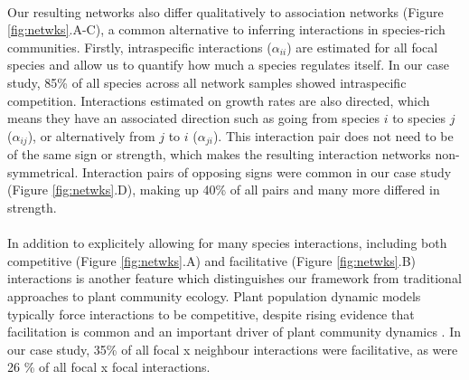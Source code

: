 \documentclass[a4,12pt]{article}
\begin{document}
        \paragraph{}
    Our resulting networks also differ qualitatively to association networks (Figure \ref{fig:netwks}.A-C), a common alternative to inferring interactions in species-rich communities. Firstly, intraspecific interactions ($\alpha_{ii}$) are estimated for all focal species and allow us to quantify how much a species regulates itself. In our case study, 85\% of all species across all network samples showed intraspecific competition. Interactions estimated on growth rates are also directed, which means they have an associated direction such as going from species $i$ to species $j$ ($\alpha_{ij}$), or alternatively from $j$ to $i$ ($\alpha_{ji}$). This interaction pair does not need to be of the same sign or strength, which makes the resulting interaction networks non-symmetrical. Interaction pairs of opposing signs were common in our case study (Figure \ref{fig:netwks}.D), making up 40\% of all pairs and many more differed in strength. 

    \paragraph{}
    In addition to explicitely allowing for many species interactions, including both competitive (Figure \ref{fig:netwks}.A) and facilitative (Figure \ref{fig:netwks}.B) interactions is another feature which distinguishes our framework from traditional approaches to plant community ecology. Plant population dynamic models typically force interactions to be competitive, despite rising evidence that facilitation is common and an important driver of plant community dynamics \parencite{Brooker2008a}. In our case study, 35\% of all focal x neighbour interactions were facilitative, as were 26 \% of all focal x focal interactions.
\end{document}
